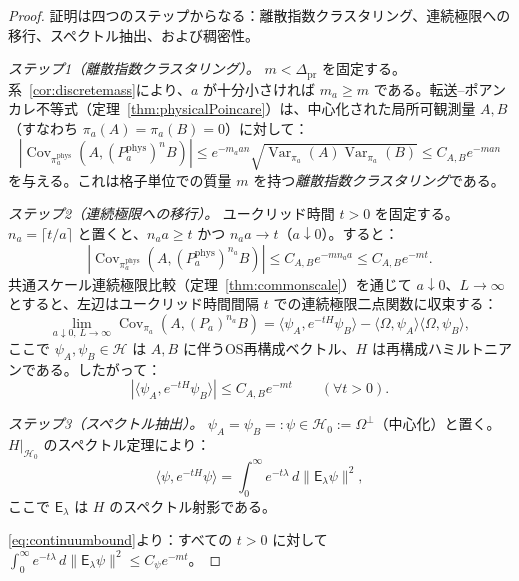 \documentclass[12pt]{article}
\theoremstyle{plain}
\theoremstyle{definition}
\numberwithin{equation}{section}
\newcommand{\Var}{\operatorname{Var}}
\newcommand{\Cov}{\operatorname{Cov}}
\newcommand{\pr}{\mathrm{pr}}
\newcommand{\phys}{\mathrm{phys}}
\begin{document}
\begin{proof}
証明は四つのステップからなる：離散指数クラスタリング、連続極限への移行、スペクトル抽出、および稠密性。

\emph{ステップ1（離散指数クラスタリング）。}
$m<\Delta_{\pr}$ を固定する。系~\ref{cor:discretemass}により、$a$ が十分小さければ $m_a\geq m$ である。転送--ポアンカレ不等式（定理~\ref{thm:physicalPoincare}）は、中心化された局所可観測量 $A,B$（すなわち $\pi_a(A)=\pi_a(B)=0$）に対して：
\begin{equation}
|\Cov_{\pi_a^{\phys}}(A,(P_a^{\phys})^n B)| \leq e^{-m_a an}\sqrt{\Var_{\pi_a}(A)\Var_{\pi_a}(B)} \leq C_{A,B}e^{-man}
\end{equation}
を与える。これは格子単位での質量 $m$ を持つ\emph{離散指数クラスタリング}である。

\emph{ステップ2（連続極限への移行）。}
ユークリッド時間 $t>0$ を固定する。$n_a=\lceil t/a\rceil$ と置くと、$n_a a\geq t$ かつ $n_a a\to t$（$a\downarrow 0$）。すると：
\begin{equation}
|\Cov_{\pi_a^{\phys}}(A,(P_a^{\phys})^{n_a}B)| \leq C_{A,B}e^{-mn_a a} \leq C_{A,B}e^{-mt}.
\end{equation}
共通スケール連続極限比較（定理~\ref{thm:commonscale}）を通じて $a\downarrow 0$、$L\to\infty$ とすると、左辺はユークリッド時間間隔 $t$ での連続極限二点関数に収束する：
\begin{equation}
\lim_{a\downarrow 0,\,L\to\infty}\Cov_{\pi_a}(A,(P_a)^{n_a}B) = \langle\psi_A,e^{-tH}\psi_B\rangle - \langle\Omega,\psi_A\rangle\langle\Omega,\psi_B\rangle,
\end{equation}
ここで $\psi_A,\psi_B\in\mathcal{H}$ は $A,B$ に伴うOS再構成ベクトル、$H$ は再構成ハミルトニアンである。したがって：
\begin{equation}\label{eq:continuumbound}
|\langle\psi_A,e^{-tH}\psi_B\rangle| \leq C_{A,B}e^{-mt}\qquad(\forall t>0).
\end{equation}

\emph{ステップ3（スペクトル抽出）。}
$\psi_A=\psi_B=:\psi\in\mathcal{H}_0:=\Omega^\perp$（中心化）と置く。$H|_{\mathcal{H}_0}$ のスペクトル定理により：
\begin{equation}
\langle\psi,e^{-tH}\psi\rangle = \int_0^\infty e^{-t\lambda}\,d\|\mathsf{E}_\lambda\psi\|^2,
\end{equation}
ここで $\mathsf{E}_\lambda$ は $H$ のスペクトル射影である。

\eqref{eq:continuumbound}より：すべての $t>0$ に対して $\int_0^\infty e^{-t\lambda}\,d\|\mathsf{E}_\lambda\psi\|^2\leq C_\psi e^{-mt}$。


\end{proof}
\end{document}
